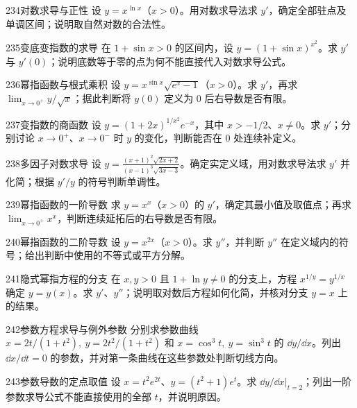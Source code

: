 \begin{exercise}{234}{对数求导与正性}
设 $y=x^{\ln x}$（$x>0$）。用对数求导法求 $y'$，确定全部驻点及单调区间；说明取自然对数的合法性。
\end{exercise}
\begin{exercise}{235}{变底变指数的求导}
在 $1+\sin x>0$ 的区间内，设 $y=(1+\sin x)^{x^2}$。求 $y'$ 与 $y'(0)$；说明底数等于零的点为何不能直接代入对数求导公式。
\end{exercise}
\begin{exercise}{236}{幂指函数与根式乘积}
设 $y=x^{\sin x}\sqrt{e^x-1}$（$x>0$）。求 $y'$，再求 $\lim_{x\to0^+}y/\sqrt x$；据此判断将 $y(0)$ 定义为 $0$ 后右导数是否有限。
\end{exercise}
\begin{exercise}{237}{变指数的商函数}
设 $y=(1+2x)^{1/x^2}e^{-x}$，其中 $x>-1/2$、$x\ne0$。求 $y'$；分别讨论 $x\to0^+$、$x\to0^-$ 时 $y$ 的变化，判断能否在 $0$ 处连续补定义。
\end{exercise}
\begin{exercise}{238}{多因子对数求导}
设 $y=\frac{(x+1)^2\sqrt{2x+2}}{(x-1)^3\sqrt{3x-3}}$。确定实定义域，用对数求导法求 $y'$ 并化简；根据 $y'/y$ 的符号判断单调性。
\end{exercise}
\begin{exercise}{239}{幂指函数的一阶导数}
求 $y=x^x$（$x>0$）的 $y'$，确定其最小值及取值点；再求 $\lim_{x\to0^+}x^x$，判断连续延拓后的右导数是否有限。
\end{exercise}
\begin{exercise}{240}{幂指函数的二阶导数}
设 $y=x^{2x}$（$x>0$）。求 $y''$，并判断 $y''$ 在定义域内的符号；给出判断中使用的不等式或平方分解。
\end{exercise}
\begin{exercise}{241}{隐式幂指方程的分支}
在 $x,y>0$ 且 $1+\ln y\ne0$ 的分支上，方程 $x^{1/y}=y^{1/x}$ 确定 $y=y(x)$。求 $y'$、$y''$；说明取对数后方程如何化简，并核对分支 $y=x$ 上的结果。
\end{exercise}
\begin{exercise}{242}{参数方程求导与例外参数}
分别求参数曲线 $x=2t/(1+t^2),\ y=2t^2/(1+t^2)$ 和 $x=\cos^3t,\ y=\sin^3t$ 的 $\dd y/\dd x$。列出 $\dd x/\dd t=0$ 的参数，并对第一条曲线在这些参数处判断切线方向。
\end{exercise}
\begin{exercise}{243}{参数导数的定点取值}
设 $x=t^2e^{2t}$、$y=(t^2+1)e^t$。求 $\left.\dd y/\dd x\right|_{t=2}$；列出一阶参数求导公式不能直接使用的全部 $t$，并说明原因。
\end{exercise}
